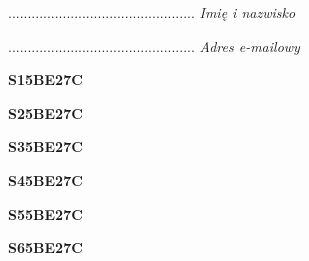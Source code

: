 \begin{turn}{90}\begin{minipage}{\linewidth} \vspace{20mm} ................................................  \textit{Imię i nazwisko}\end{minipage}\end{turn}

\begin{turn}{90}\begin{minipage}{\linewidth} \vspace{20mm} ................................................  \textit{Adres e-mailowy}\end{minipage}\end{turn}

\begin{turn}{90}\huge \begin{minipage}{\linewidth} \vspace{10mm}\textbf{S15BE27C}\end{minipage}\end{turn}

\begin{turn}{90}\huge \begin{minipage}{\linewidth} \vspace{10mm}\textbf{S25BE27C}\end{minipage}\end{turn}

\begin{turn}{90}\huge \begin{minipage}{\linewidth} \vspace{10mm}\textbf{S35BE27C}\end{minipage}\end{turn}

\begin{turn}{90}\huge \begin{minipage}{\linewidth} \vspace{10mm}\textbf{S45BE27C}\end{minipage}\end{turn}

\begin{turn}{90}\huge \begin{minipage}{\linewidth} \vspace{10mm}\textbf{S55BE27C}\end{minipage}\end{turn}

\begin{turn}{90}\huge \begin{minipage}{\linewidth} \vspace{10mm}\textbf{S65BE27C}\end{minipage}\end{turn}

